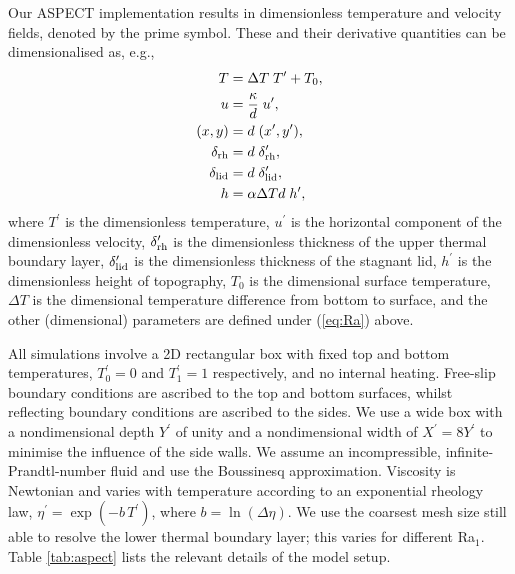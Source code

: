 \documentclass[trackchanges]{aastex63}
\begin{document}
Our ASPECT implementation 
results in dimensionless temperature and velocity fields, denoted by the prime symbol. These and their derivative quantities can be dimensionalised as, e.g.,
\begin{align}
    \begin{split} \label{eq:dimensionalise}
    T &= \Delta T \; T^\prime + T_0, \\
    u &= \frac{\kappa}{d} \; u^\prime, \\
    (x, y) &= d \; (x^\prime, y^\prime), \\
    \delta_{\rm rh} &= d \; \delta_{\rm rh}^\prime, \\
    \delta_{\rm lid} &= d \; \delta_{\rm lid}^\prime, \\
    h &= \alpha \Delta T d \; h^\prime,
    \end{split}
\end{align}
where $T^\prime$ is the dimensionless temperature, $u^\prime$ is the horizontal component of the dimensionless velocity, $\delta_{\rm rh}^\prime$ is the dimensionless thickness of the upper thermal boundary layer, $\delta_{\rm lid}^\prime$ is the dimensionless thickness of the stagnant lid, $h^\prime$ is the dimensionless height of topography, $T_0$ is the dimensional surface temperature, $\Delta T$ is the dimensional temperature difference from bottom to surface, and the other (dimensional) parameters are defined under (\ref{eq:Ra}) above. 

All simulations involve a 2D rectangular box with fixed top and bottom temperatures, $T_0^\prime = 0$ and $T_1^\prime = 1$ respectively, and no internal heating. Free-slip boundary conditions are ascribed to the top and bottom surfaces, whilst reflecting boundary conditions are ascribed to the sides. We use a wide box with a nondimensional depth $Y^\prime$ of unity and a nondimensional width of $X^\prime = 8Y^\prime$ to minimise the influence of the side walls. We assume an incompressible, infinite-Prandtl-number fluid and use the Boussinesq approximation. Viscosity is Newtonian and varies with temperature according to an exponential rheology law, $\eta^\prime = \exp(-b \, T^\prime)$, where $b = \ln (\Delta \eta)$. We use the coarsest mesh size still able to resolve the lower thermal boundary layer; this varies for different Ra$_1$. Table \ref{tab:aspect} lists the relevant details of the model setup.
\end{document}
